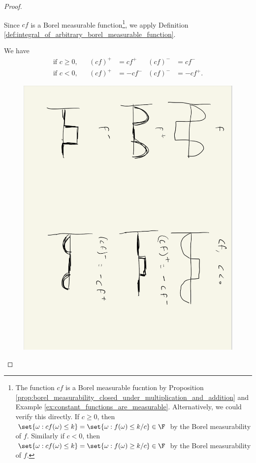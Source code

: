 \documentclass{article} %
\begin{document}
\begin{proof}
\begin{alphabate}
\item Since $cf$ is a Borel measurable function\footnote{The function $cf$ is a Borel measurable fucntion by Proposition \ref{prop:borel_measurability_closed_under_multiplication_and_addition} and Example \ref{ex:constant_functions_are_measurable}.  Alternatively, we could verify this directly.  If $c \geq 0$, then $\set{\omega : c f(\omega) \leq k} = \set{\omega : f(\omega) \leq k/c} \in \F$ by the Borel measurability of $f$.  Similarly if  $c < 0$, then $\set{\omega : c f(\omega) \leq k} = \set{\omega : f(\omega) \geq k/c} \in \F$ by the Borel measurability of $f$.}, we apply Definition \ref{def:integral_of_arbitrary_borel_measurable_function}.

We have 
\begin{subequations}
\begin{align}
\text{if $c \geq 0$}, && (cf)^+ &= cf^+  & (cf)^- &= cf^-   \label{eqn:decomposing_scalar_multiple_of_borel_measurable_function_into_two_nonnegative_functions_when_scalar_multiple_is_nonnegative} \\
\text{if $c < 0$}, && (cf)^+ &= -cf^-  & (cf)^- &= -cf^+. \label{eqn:decomposing_scalar_multiple_of_borel_measurable_function_into_two_nonnegative_functions_when_scalar_multiple_is_negative} 
\end{align}
\end{subequations}

\begin{figure}[H]
\centering
\includegraphics[width=.5\textwidth, angle=90]{images/decomposing_scalar_multiple_of_borel_measurable_function_into_two_nonnegative_functions_when_scalar_multiple_is_negative}	
\end{figure}



\end{alphabate}
\end{proof}
\end{document}
